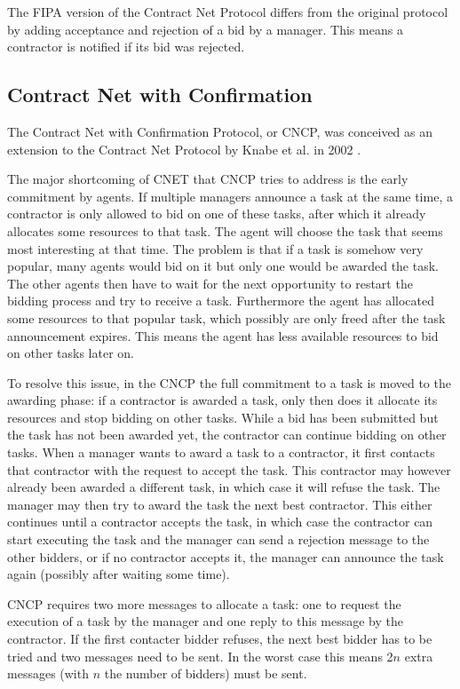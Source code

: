 \documentclass[10pt,a4paper,twocolumn]{article}
\begin{document}
The FIPA version of the Contract Net Protocol \cite{CNETStandard} differs from the original protocol by adding acceptance and rejection of a bid by a manager. This means a contractor is notified if its bid was rejected.

\subsection{Contract Net with Confirmation} 
The Contract Net with Confirmation Protocol, or CNCP, was conceived as an extension to the Contract Net Protocol by Knabe et al. in 2002 \cite{CNCP}.

The major shortcoming of CNET that CNCP tries to address is the early commitment by agents. If multiple managers announce a task at the same time, a contractor is only allowed to bid on one of these tasks, after which it already allocates some resources to that task. The agent will choose the task that seems most interesting at that time. The problem is that if a task is somehow very popular, many agents would bid on it but only one would be awarded the task. The other agents then have to wait for the next opportunity to restart the bidding process and try to receive a task. Furthermore the agent has allocated some resources to that popular task, which possibly are only freed after the task announcement expires. This means the agent has less available resources to bid on other tasks later on.

To resolve this issue, in the CNCP the full commitment to a task is moved to the awarding phase: if a contractor is awarded a task, only then does it allocate its resources and stop bidding on other tasks. While a bid has been submitted but the task has not been awarded yet, the contractor can continue bidding on other tasks. When a manager wants to award a task to a contractor, it first contacts that contractor with the request to accept the task. This contractor may however already been awarded a different task, in which case it will refuse the task. The manager may then try to award the task the next best contractor. This either continues until a contractor accepts the task, in which case the contractor can start executing the task and the manager can send a rejection message to the other bidders, or if no contractor accepts it, the manager can announce the task again (possibly after waiting some time).

CNCP requires two more messages to allocate a task: one to request the execution of a task by the manager and one reply to this message by the contractor. If the first contacter bidder refuses, the next best bidder has to be tried and two messages need to be sent. In the worst case this means 2$n$ extra messages (with $n$ the number of bidders) must be sent.
\end{document}

